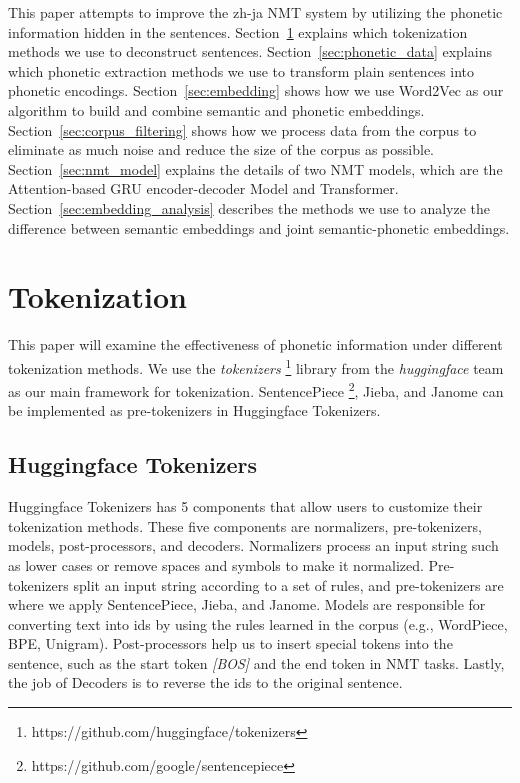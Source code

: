 \hspace{24pt}

This paper attempts to improve the zh-ja NMT system by utilizing the phonetic information hidden in the sentences. Section~\ref{sec:tokenization} explains which tokenization methods we use to deconstruct sentences. Section~\ref{sec:phonetic_data} explains which phonetic extraction methods we use to transform plain sentences into phonetic encodings. Section~\ref{sec:embedding} shows how we use Word2Vec as our algorithm to build and combine semantic and phonetic embeddings. Section~\ref{sec:corpus_filtering} shows how we process data from the corpus to eliminate as much noise and reduce the size of the corpus as possible. Section~\ref{sec:nmt_model} explains the details of two NMT models, which are the Attention-based GRU encoder-decoder Model and Transformer. Section~\ref{sec:embedding_analysis} describes the methods we use to analyze the difference between semantic embeddings and joint semantic-phonetic embeddings.

\section{Tokenization} \label{sec:tokenization}

This paper will examine the effectiveness of phonetic information under different tokenization methods. We use the \textit{tokenizers} \footnote{https://github.com/huggingface/tokenizers} library from the \textit{huggingface} team as our main framework for tokenization. SentencePiece \footnote{https://github.com/google/sentencepiece}, Jieba, and Janome can be implemented as pre-tokenizers in Huggingface Tokenizers.

\subsection{Huggingface Tokenizers} \label{sec:tokenizers}

Huggingface Tokenizers has 5 components that allow users to customize their tokenization methods. These five components are normalizers, pre-tokenizers, models, post-processors, and decoders. Normalizers process an input string such as lower cases or remove spaces and symbols to make it normalized. Pre-tokenizers split an input string according to a set of rules, and pre-tokenizers are where we apply SentencePiece, Jieba, and Janome. Models are responsible for converting text into ids by using the rules learned in the corpus (e.g., WordPiece, BPE, Unigram). Post-processors help us to insert special tokens into the sentence, such as the start token \textit{[BOS]} and the end token \text{[EOS]} in NMT tasks. Lastly, the job of Decoders is to reverse the ids to the original sentence.

